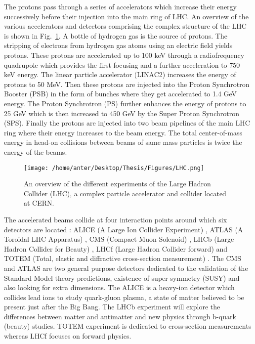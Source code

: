 The protons pass through a series of accelerators which increase their energy successively before their injection into the main ring of LHC. An overview of the various accelerators and detectors comprising the complex structure of the LHC is shown in Fig.~\ref{fig:LHC}. A bottle of hydrogen gas is the source of protons. The stripping of electrons from hydrogen gas atoms using an electric field yields protons. These protons are accelerated up to 100 keV through a radiofrequency quadrupole which provides the first focusing and a further acceleration to 750 keV energy. The linear particle accelerator (LINAC2) increases the energy of protons to 50 MeV. Then these protons are injected into the Proton Synchrotron Booster (PSB) in the form of bunches where they get accelerated to 1.4 GeV energy. The Proton Synchrotron (PS) further enhances the energy of protons to 25 GeV which is then increased to 450 GeV by the Super Proton Synchrotron (SPS). Finally the protons are injected into two beam pipelines of the main LHC ring where their energy increases to the beam energy. The total center-of-mass energy in head-on collisions between beams of same mass particles is twice the energy of the beams. 

\begin{figure}[!h]
 \begin{center} 
 \hspace*{-5mm}
 \texttt{[image: /home/anter/Desktop/Thesis/Figures/LHC.png]}\\
 \vspace*{5mm}
 \caption[An overview of the different experiments of the Large Hadron Collider (LHC), a complex particle accelerator and collider located at CERN.]{An overview of the different experiments of the Large Hadron Collider (LHC), a complex particle accelerator and collider located at CERN\footnotemark.}
 \label{fig:LHC}
 \end{center}
\end{figure}

The accelerated beams collide at four interaction points around which six detectors are located : ALICE (A Large Ion Collider Experiment) \cite{Aamodt:2008zz}, ATLAS (A Toroidal LHC Apparatus) \cite{Aad:2008zzm}, CMS (Compact Muon Solenoid) \cite{Chatrchyan:2008aa,Bayatian:2006nff,Ball:2007zza}, LHCb (Large Hadron Collider for Beauty) \cite{Alves:2008zz}, LHCf (Large Hadron Collider forward)\cite{Adriani:2008zz} and TOTEM (Total, elastic and diffractive cross-section measurement) \cite{Anelli:2008zza}. The CMS and ATLAS are two general purpose detectors dedicated to the validation of the Standard Model theory predictions, existence of super-symmetry (SUSY) and also looking for extra dimensions. The ALICE is a heavy-ion detector which collides lead ions to study quark-gluon plasma, a state of matter believed to be present just after the Big Bang. The LHCb experiment will explore the differences between matter and antimatter and new physics through b-quark (beauty) studies. TOTEM experiment is dedicated to cross-section measurements whereas LHCf focuses on forward physics. 

